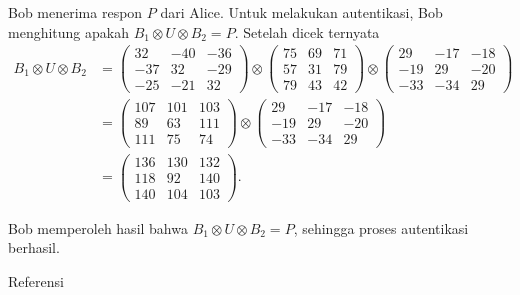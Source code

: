 \documentclass[aspectratio=169]{beamer}
\theoremstyle{definition}
\numberwithin{definisi}{section}
\begin{document}
\begin{frame}
  \frametitle{\insertsection}
  Bob menerima respon $P$ dari Alice. Untuk melakukan autentikasi, Bob menghitung apakah $B_1 \otimes U \otimes B_2 = P$.
  Setelah dicek ternyata
  \begin{align*}
    B_1 \otimes U \otimes B_2 & =
    \begin{pmatrix}
      32  & -40 & -36 \\
      -37 & 32  & -29 \\
      -25 & -21 & 32
    \end{pmatrix}
    \otimes
    \begin{pmatrix}
      75 & 69 & 71 \\
      57 & 31 & 79 \\
      79 & 43 & 42
    \end{pmatrix}
    \otimes
    \begin{pmatrix}
      29  & -17 & -18 \\
      -19 & 29  & -20 \\
      -33 & -34 & 29
    \end{pmatrix}               \\
                              & =
    \begin{pmatrix}
      107 & 101 & 103 \\
      89  & 63  & 111 \\
      111 & 75  & 74
    \end{pmatrix}
    \otimes
    \begin{pmatrix}
      29  & -17 & -18 \\
      -19 & 29  & -20 \\
      -33 & -34 & 29
    \end{pmatrix}               \\
                              & =
    \begin{pmatrix}
      136 & 130 & 132 \\
      118 & 92  & 140 \\
      140 & 104 & 103
    \end{pmatrix}.
  \end{align*}

  Bob memperoleh hasil bahwa $B_1 \otimes U \otimes B_2 = P$, sehingga proses autentikasi berhasil.

\end{frame}


\begin{frame}[allowframebreaks]{\Large Referensi}
  \printbibliography
\end{frame}
\end{document}
